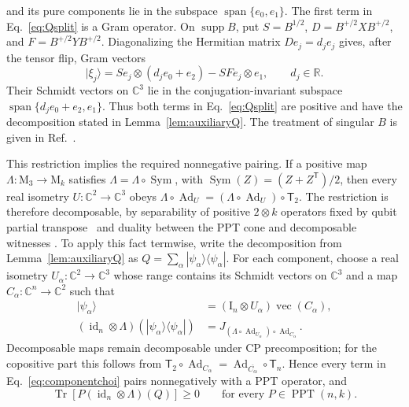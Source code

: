 \documentclass[aps,prl,reprint,superscriptaddress,nofootinbib]{revtex4-2}
\newcommand{\M}{\mathrm{M}}
\newcommand{\I}{\mathrm{I}}
\newcommand{\C}{\mathbb C}
\newcommand{\id}{\operatorname{id}}
\newcommand{\Ad}{\operatorname{Ad}}
\newcommand{\Tr}{\operatorname{Tr}}
\newcommand{\PPT}{\operatorname{PPT}}
\newcommand{\Sym}{\operatorname{Sym}}
\newcommand{\supp}{\operatorname{supp}}
\newcommand{\vecop}{\operatorname{vec}}
\newcommand{\Tmap}{\mathsf T}
\begin{document}
and its pure components lie in the subspace
$\operatorname{span}\{e_0,e_1\}$.  The first term in
Eq.~\eqref{eq:Qsplit} is a Gram operator.  On $\supp B$, put
$S=B^{1/2}$, $D=B^{+/2}XB^{+/2}$, and
$F=B^{+/2}YB^{+/2}$.  Diagonalizing the Hermitian matrix
$De_j=d_je_j$ gives, after the tensor flip, Gram vectors
\begin{equation}
 |\xi_j\rangle=Se_j\otimes(d_je_0+e_2)-SFe_j\otimes e_1,
 \qquad d_j\in\mathbb R.
\label{eq:qutritsubspace}
\end{equation}
Their Schmidt vectors on $\C^3$ lie in the conjugation-invariant subspace
$\operatorname{span}\{d_je_0+e_2,e_1\}$.  Thus both terms in
Eq.~\eqref{eq:Qsplit} are positive and have the decomposition stated in
Lemma~\ref{lem:auxiliaryQ}.  The treatment of singular $B$ is given
in Ref.~\cite{Supplement}.

This restriction implies the required nonnegative pairing.  If a positive map
$\Lambda:\M_3\to\M_k$ satisfies $\Lambda=\Lambda\circ\Sym$, with
$\Sym(Z)=(Z+Z^{\mathsf T})/2$, then every real isometry
$U:\C^2\to\C^3$ obeys
$\Lambda\circ\Ad_U=(\Lambda\circ\Ad_U)\circ\Tmap_2$.  The restriction is
therefore decomposable, by separability of positive $2\otimes k$ operators
fixed by qubit partial transpose~\cite[Theorem~2]{Kraus2000} and
duality between the PPT cone and decomposable witnesses
\cite{Skowronek2009}.  To apply this fact
termwise, write the decomposition from Lemma~\ref{lem:auxiliaryQ} as
$Q=\sum_\alpha|\psi_\alpha\rangle\langle\psi_\alpha|$.  For each component,
choose a real isometry $U_\alpha:\C^2\to\C^3$ whose range contains its
Schmidt vectors on $\C^3$ and a map $C_\alpha:\C^n\to\C^2$ such that
\begin{align}
 |\psi_\alpha\rangle
 &=\left(\I_n\otimes U_\alpha\right)\vecop(C_\alpha),
\nonumber\\
 (\id_n\otimes\Lambda)
 (|\psi_\alpha\rangle\langle\psi_\alpha|)
 &=J_{(\Lambda\circ\Ad_{U_\alpha})\circ\Ad_{C_\alpha}}.
\label{eq:componentchoi}
\end{align}
Decomposable maps remain decomposable under CP precomposition; for the
copositive part this follows from
$\Tmap_2\circ\Ad_{C_\alpha}
=\Ad_{\overline{C_\alpha}}\circ\Tmap_n$.  Hence every term in
Eq.~\eqref{eq:componentchoi} pairs nonnegatively with a PPT operator, and
\begin{equation}
 \Tr\!\left[P(\id_n\otimes\Lambda)(Q)\right]\geq0
 \qquad\text{for every }P\in\PPT(n,k).
\label{eq:nonnegativepairing}
\end{equation}
\end{document}
